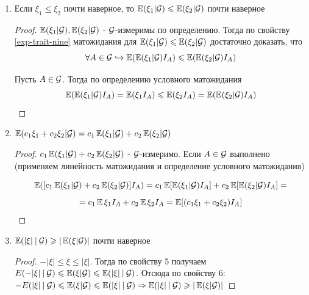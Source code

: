 \begin{enumerate}
\begin{proof}
        Проверим второе равенство: \( \E(\E(\xi|\G_2)|\G_1)=\E(\xi|\G_1) \)
        
        По определению $\E(\xi | \G_1)$ - $\G_1$-измеримо. Значит осталось проверить, что 
        \[ \forall A \in \G_1 \hookrightarrow \E(\E(\xi|\G_1) \cdot I_A)=\E(\E(\xi | \G_2) \cdot I_A) \]
        
        Так как $A \in \G_1$, по определению условного матожидания в $\G_1$ получаем \( \E(\E(\xi | \G_1) \cdot I_A)=\E \xi I_A \)
        
        С другой стороны, $\G_1 \subset \G_2 \Rightarrow A \in \G_2$. Тогда по определению условного матожидания в $\G_2$: \( \E(\E(\xi | \G_2) \cdot I_A)=\E \xi I_A \). Тогда \( \E(\E(\xi | \G_1) \cdot I_A)=\E(\E(\xi | \G_2) \cdot I_A) \) и искомое равенство доказано
    \end{proof}
    
    \item Если $\xi_1 \leqslant \xi_2$ почти наверное, то $\E(\xi_1 | \G) \leqslant \E(\xi_2 | \G)$ почти наверное
    \begin{proof}
        \( \E(\xi_1 | \G), \E(\xi_2 | \G) \) - $\G$-измеримы по определению. Тогда по свойству \ref{exp-trait-nine} матожидания для \( \E(\xi_1 | \G) \leqslant \E(\xi_2 | \G) \) достаточно доказать, что 
        \[ \forall A \in \G \hookrightarrow \E(\E(\xi_1 | \G) I_A) \leqslant \E(\E(\xi_2 | \G) I_A) \]
        
        Пусть $A \in \G$. Тогда по определению условного матожидания
        \[ \E(\E(\xi_1 | \G) I_A)=\E(\xi_1 I_A) \leqslant \E(\xi_2 I_A) = \E(\E(\xi_2 | \G)I_A) \]
    \end{proof}
    
    \item \( \E(c_1 \xi_1 + c_2 \xi_2 | \G)=c_1 \E(\xi_1|\G)+c_2 \E(\xi_2 | \G) \)
    \begin{proof}
        \( c_1 \E(\xi_1|\G)+c_2 \E(\xi_2 | \G) \) - $\G$-измеримо. Если $A \in \G$ выполнено (применяем линейность матожидания и определение условного матожидания)
        
        \[ \E([c_1 \E(\xi_1 | \G) + c_2 \E(\xi_2|\G)]I_A)=c_1 \E[\E(\xi_1|\G) I_A]+c_2 \E[\E(\xi_2 | \G) I_A]= \]
        \[ = c_1 \E\xi_1 I_A +c_2 \E \xi_2 I_A = \E[(c_1 \xi_1 + c_2 \xi_2) I_A] \]
    \end{proof}
    
    \item \( \E(|\xi| \: | \: \G) \geqslant |\E(\xi|\G)| \) почти наверное
    \begin{proof}
        \( -|\xi| \leqslant \xi \leqslant |\xi| \). Тогда по свойству 5 получаем \( E(-|\xi| \: | \: \G) \leqslant \E(\xi | \G) \leqslant \E(|\xi| \: | \: \G) \). Отсюда по свойству 6: \( -E(|\xi| \: | \: \G) \leqslant \E(\xi | \G) \leqslant \E(|\xi| \: | \: \G) \Rightarrow \E(|\xi| \: | \: \G) \geqslant |\E(\xi|\G)| \)
    \end{proof}
    

\end{enumerate}
